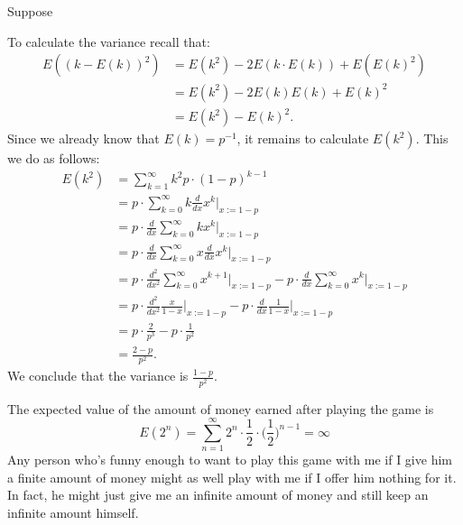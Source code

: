 \documentclass{article}
\begin{document}
\maketitle

\begin{ex}
Suppose 
\end{ex}

\begin{ex}
To calculate the variance recall that:
\begin{align*}
E((k-E(k))^2) & =E(k^2)-2E(k\cdot E(k))+E(E(k)^2)
  \\
& = E(k^2)-2E(k)E(k)+E(k)^2
  \\
& =E(k^2)-E(k)^2.
\end{align*}
Since we already know that $E(k)=p^{-1}$, it remains to calculate $E(k^2)$. This we do as follows:
\begin{align*}
E(k^2) 
& = 
  \sum_{k=1}^\infty k^2 p\cdot (1-p)^{k-1}
  \\
& = 
  p\cdot\sum_{k=0}^\infty k\frac{d}{dx} x^k\Big|_{x:=1-p}
  \\
& =
  p\cdot\frac{d}{dx}\sum_{k=0}^\infty k x^k\Big|_{x:=1-p}
  \\
& =
  p\cdot\frac{d}{dx}\sum_{k=0}^\infty x\frac{d}{dx}x^k\Big|_{x:=1-p}
  \\
& =
  p\cdot\frac{d^2}{dx^2}\sum_{k=0}^\infty x^{k+1}\Big|_{x:=1-p}
  -p\cdot\frac{d}{dx}\sum_{k=0}^\infty x^k\Big|_{x:=1-p}
  \\
& =
  p\cdot\frac{d^2}{dx^2}\frac{x}{1-x}\Big|_{x:=1-p}
  -p\cdot\frac{d}{dx}\frac{1}{1-x}\Big|_{x:=1-p}
  \\
& =
  p\cdot \frac{2}{p^3}
  -p\cdot\frac{1}{p^2}
  \\
& = 
  \frac{2-p}{p^2}.
\end{align*}
We conclude that the variance is $\frac{1-p}{p^2}$.
\end{ex}

\begin{ex}
The expected value of the amount of money earned after playing the game is
\begin{equation*}
E(2^n) = \sum_{n=1}^\infty 2^n\cdot\frac{1}{2}\cdot\Big(\frac{1}{2}\Big)^{n-1}=\infty
\end{equation*}
Any person who's funny enough to want to play this game with me if I give him a finite amount of money might as well play with me if I offer him nothing for it. In fact, he might just give me an infinite amount of money and still keep an infinite amount himself.
\end{ex}
\end{document}
